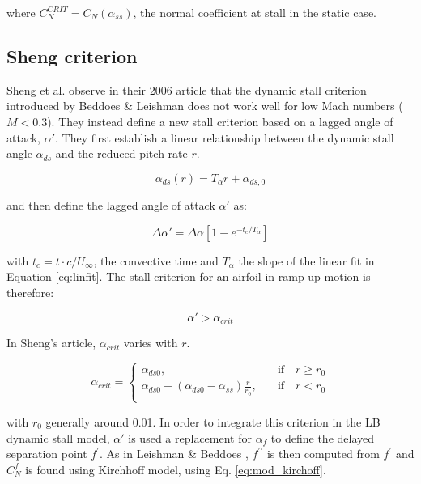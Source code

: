 \noindent where $C_N^{CRIT}=C_N(\alpha_{ss})$, the normal coefficient at stall in the static case. 

\subsection{Sheng criterion}
\label{section:sheng_criterion}

Sheng et al. observe in their 2006 article \cite{sheng_new_2006} that the dynamic stall criterion introduced by Beddoes \& Leishman does not work well for low Mach numbers ($M<0.3$). They instead define a new stall criterion based 
on a lagged angle of attack, $\alpha'$. They first establish a linear relationship between the dynamic stall angle $\alpha_{ds}$ and the reduced pitch rate $r$. 

\begin{equation}
	\alpha_{ds}(r) = T_\alpha r+\alpha_{ds,0}
	\label{eq:linfit}
\end{equation}

\noindent and then define the lagged angle of attack $\alpha'$ as:

\begin{equation}
\Delta \alpha' = \Delta \alpha\left[1-e^{-t_c/T_\alpha} \right]
\label{eq:alpha_lag}
\end{equation}

\noindent with $t_c=t \cdot c/U_{\infty}$, the convective time and $T_\alpha$ the slope of the linear fit in Equation \ref{eq:linfit}. The stall criterion for an airfoil in ramp-up motion is therefore: 

\begin{equation}
\alpha' > \alpha_{crit}
\label{eq:stall_criterion}
\end{equation}

In Sheng's article, $\alpha_{crit}$ varies with $r$. 

\begin{equation}
\alpha_{crit} =
\begin{cases}
\alpha_{ds0}, &\quad \text{if} \quad r \geq r_0 \\
\alpha_{ds0} + (\alpha_{ds0}-\alpha_{ss}) \frac{r}{r_0}, &\quad \text{if} \quad r < r_0 \\
\end{cases}
\label{eq:alpha_crit}
\end{equation}

\noindent with $r_0$ generally around 0.01. In order to integrate this criterion in the LB dynamic stall model, $\alpha'$ is used a replacement for $\alpha_f$ to define the delayed separation point $f^{\prime}$. As in Leishman \& Beddoes \cite{leishman_semi-empirical_1989}, $f^{\prime \prime}$ is then computed from $f^{\prime}$ and $C_N^f$ is found using Kirchhoff model, using Eq. \eqref{eq:mod_kirchoff}. 

